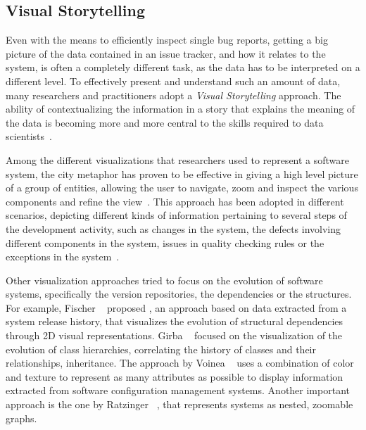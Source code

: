 

\subsection{Visual Storytelling}

Even with the means to efficiently inspect single bug reports, getting a big picture of the data contained in an issue tracker, and how it relates to the system, is often a completely different task, as the data has to be interpreted on a different level.
To effectively present and understand such an amount of data, many researchers and practitioners adopt a \emph{Visual Storytelling} approach.
The ability of contextualizing the information in a story that explains the meaning of the data is becoming more and more central to the skills required to data scientists~\cite{Segel2010a}.

Among the different visualizations that researchers used to represent a software system, the city metaphor has proven to be effective in giving a high level picture of a group of entities, allowing the user to navigate, zoom and inspect the various components and refine the view~\cite{Wett2011a}.
This approach has been adopted in different scenarios, depicting different kinds of information pertaining to several steps of the development activity, such as changes in the system, the defects involving different components in the system, issues in quality checking rules or the exceptions in the system~\cite{Panas2003a}.

Other visualization approaches tried to focus on the evolution of software systems, specifically the version repositories, the dependencies or the structures.
For example, Fischer \etal~\cite{Fisch2006a} proposed , an approach based on data extracted from a system release history, that visualizes the evolution of structural dependencies through 2D visual representations.
Girba \etal~\cite{Girb2005a} focused on the visualization of the evolution of class hierarchies, correlating the history of classes and their relationships, \eg inheritance.
The approach by Voinea \etal~\cite{Voin2007a} uses a combination of color and texture to represent as many attributes as possible to display information extracted from software configuration management systems.
Another important approach is the one by Ratzinger \etal~\cite{Ratz2005a}, that represents systems as nested, zoomable graphs.


